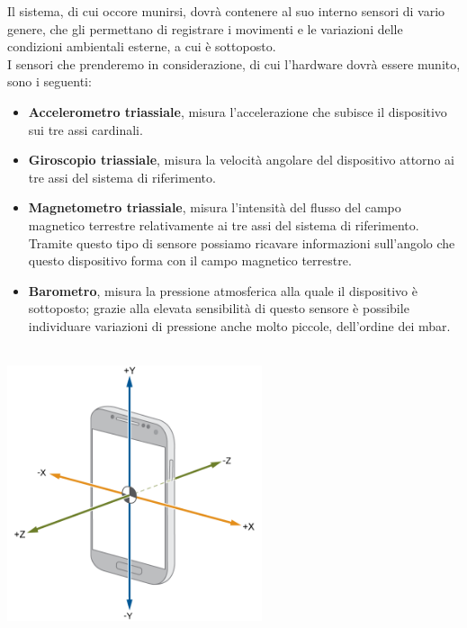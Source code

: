 \documentclass[a4paper, oneside]{book}
\begin{document}
Il sistema, di cui occore munirsi, dovrà contenere al suo interno sensori di vario genere, che gli permettano di registrare i movimenti e le variazioni delle condizioni ambientali esterne, a cui è sottoposto. \\
I sensori che prenderemo in considerazione, di cui l'hardware dovrà essere munito, sono i seguenti:
\begin{itemize}
\item \textbf{Accelerometro triassiale}, misura l’accelerazione che subisce il dispositivo sui tre assi cardinali.
\item \textbf{Giroscopio triassiale}, misura la velocità angolare del dispositivo attorno ai tre assi del sistema di riferimento.
\item \textbf{Magnetometro triassiale}, misura l’intensità del flusso del campo magnetico terrestre relativamente ai tre assi del sistema di riferimento. Tramite questo tipo di sensore possiamo ricavare informazioni sull’angolo che questo dispositivo forma con il campo magnetico terrestre.
\item \textbf{Barometro}, misura la pressione atmosferica alla quale il dispositivo è sottoposto; grazie alla elevata sensibilità di questo sensore è possibile individuare variazioni di pressione anche molto piccole, dell’ordine dei mbar.\\ \\
\end{itemize}

\begin{center}
\begin{minipage}{0.68\linewidth}
\begin{center}
\includegraphics[width=75mm]{./images/triaxial_sensor.png}
\vspace{3mm}
\end{center}
\end{minipage}
\end{center}
\vspace{2mm}
\end{document}
